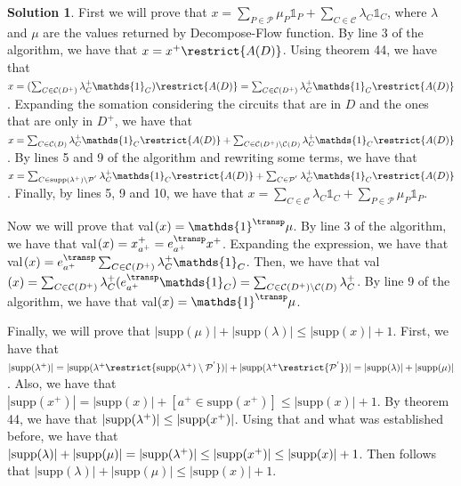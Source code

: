 \documentclass[11pt,leqno,final]{amsart}
\theoremstyle{definition}
\newtheorem{solution}{Solution}
\begin{document}

\begin{solution}
    First we will prove that $x = \sum_{P \in \mathcal{P}} \mu_{P} \mathds{1}_P + \sum_{C \in \mathcal{C}} \lambda_C \mathds{1}_C$, where $\lambda$ and $\mu$ are the values returned by Decompose-Flow function. By line 3 of the algorithm, we have that $x = x^{+} \restrict{A(D)}$. Using theorem 44, we have that $x = (\sum_{C \in \mathcal{C}(D^{+})} \lambda^{+}_C \mathds{1}_C) \restrict{A(D)} = \sum_{C \in \mathcal{C}(D^{+})} \lambda^{+}_C \mathds{1}_C \restrict{A(D)}$. Expanding the somation considering the circuits that are in $D$ and the ones that are only in $D^{+}$, we have that $x = \sum_{C \in \mathcal{C}(D)} \lambda^{+}_C \mathds{1}_C \restrict{A(D)} + \sum_{C \in \mathcal{C}(D^{+}) \setminus \mathcal{C}(D)} \lambda^{+}_C \mathds{1}_C \restrict{A(D)}$. By lines 5 and 9 of the algorithm and rewriting some terms, we have that $x = \sum_{C \in \text{supp}(\lambda^{+})\setminus \mathcal{P^{'}}} \lambda^{+}_C \mathds{1}_C \restrict{A(D)} + \sum_{C \in \mathcal{P^{'}}} \lambda^{+}_C \mathds{1}_C \restrict{A(D)}$. Finally, by lines 5, 9 and 10, we have that $x = \sum_{C \in \mathcal{C}} \lambda_C \mathds{1}_C + \sum_{P \in \mathcal{P}} \mu_P \mathds{1}_P $. 

    Now we will prove that val$(x) = \mathds{1}^{\transp} \mu$. By line 3 of the algorithm, we have that val$(x) = x^{+}_{a^{+}} = e^{\transp}_{a^{+}} x^{+}$. Expanding the expression, we have that val$(x) = e^{\transp}_{a^{+}} \sum_{C \in \mathcal{C}(D^{+})} \lambda^{+}_C \mathds{1}_C$. Then, we have that val$(x) =  \sum_{C \in \mathcal{C}(D^{+})} \lambda^{+}_C (e^{\transp}_{a^{+}} \mathds{1}_C) = \sum_{C \in \mathcal{C}(D^{+}) \setminus \mathcal{C}(D)} \lambda^{+}_C$. By line 9 of the algorithm, we have that val$(x) = \mathds{1}^{\transp} \mu$.

    Finally, we will prove that $|\text{supp}(\mu)| + |\text{supp}(\lambda)| \leq |\text{supp}(x)| + 1$. First, we have that $|\text{supp}(\lambda^{+})| = |\text{supp}(\lambda^{+} \restrict{ \text{supp}(\lambda^{+}) \setminus \mathcal{P^{'}}})| + |\text{supp}(\lambda^{+} \restrict{\mathcal{P^{'}}})| = |\text{supp}(\lambda)| + |\text{supp}(\mu)|$. Also, we have that $|\text{supp}(x^{+})| = |\text{supp}(x)| + [a^{+} \in \text{supp}(x^{+})] \leq |\text{supp}(x)| + 1$. By theorem 44, we have that $|\text{\text{supp}}(\lambda^{+})| \leq |\text{\text{supp}}(x^{+})|$. Using that and what was established before, we have that  $|\text{supp}(\lambda)| + |\text{supp}(\mu)| = |\text{\text{supp}}(\lambda^{+})| \leq |\text{\text{supp}}(x^{+})| \leq |\text{supp}(x)| + 1$. Then follows that $|\text{supp}(\lambda)| + |\text{supp}(\mu)| \leq |\text{supp}(x)| + 1$.  

\end{solution}
\end{document}
